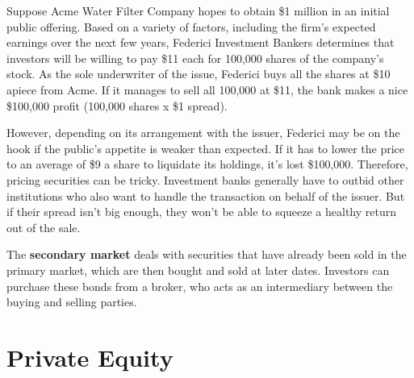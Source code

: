\documentclass{article}
\begin{document}
    \begin{example}
      Suppose Acme Water Filter Company hopes to obtain \$1 million in an initial public offering. Based on a variety of factors, including the firm’s expected earnings over the next few years, Federici Investment Bankers determines that investors will be willing to pay \$11 each for 100,000 shares of the company’s stock. As the sole underwriter of the issue, Federici buys all the shares at \$10 apiece from Acme. If it manages to sell all 100,000 at \$11, the bank makes a nice \$100,000 profit (100,000 shares x \$1 spread). 

      However, depending on its arrangement with the issuer, Federici may be on the hook if the public’s appetite is weaker than expected. If it has to lower the price to an average of \$9 a share to liquidate its holdings, it’s lost \$100,000. Therefore, pricing securities can be tricky. Investment banks generally have to outbid other institutions who also want to handle the transaction on behalf of the issuer. But if their spread isn’t big enough, they won’t be able to squeeze a healthy return out of the sale. 
    \end{example}

    \begin{definition}
      The \textbf{secondary market} deals with securities that have already been sold in the primary market, which are then bought and sold at later dates. Investors can purchase these bonds from a broker, who acts as an intermediary between the buying and selling parties. 
    \end{definition}

\section{Private Equity}
\end{document}
